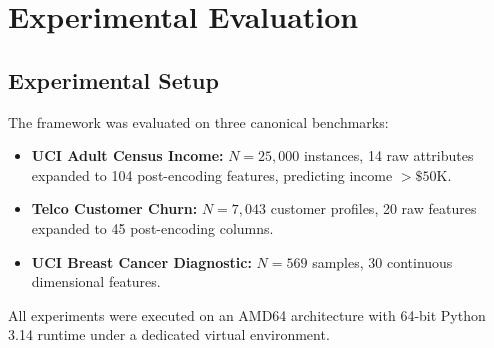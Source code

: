 \documentclass[conference]{IEEEtran}
\begin{document}
\section{Experimental Evaluation}
\subsection{Experimental Setup}
The framework was evaluated on three canonical benchmarks:
\begin{itemize}
    \item \textbf{UCI Adult Census Income:} $N=25,000$ instances, 14 raw attributes expanded to 104 post-encoding features, predicting income $> \$50\text{K}$.
    \item \textbf{Telco Customer Churn:} $N=7,043$ customer profiles, 20 raw features expanded to 45 post-encoding columns.
    \item \textbf{UCI Breast Cancer Diagnostic:} $N=569$ samples, 30 continuous dimensional features.
\end{itemize}
All experiments were executed on an AMD64 architecture with 64-bit Python 3.14 runtime under a dedicated virtual environment.
\end{document}
